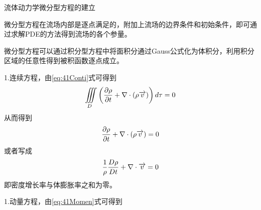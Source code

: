 
流体动力学微分型方程的建立

微分型方程在流场内部是逐点满足的，附加上流场的边界条件和初始条件，即可通过求解PDE的方法得到流场的各个参量。

微分型方程可以通过积分型方程中将面积分通过Gauss公式化为体积分，利用积分区域的任意性得到被积函数逐点成立。

1.连续方程，由\eqref{eq:41Conti}式可得到
\begin{equation}
\iiint\limits_D \left(\frac{\partial \rho}{\partial t}+\nabla\cdot(\rho \overrightarrow{v})\right)d\tau=0
\end{equation}
从而得到
\begin{equation}\label{eq:52Conti}
 \frac{\partial \rho}{\partial t}+\nabla\cdot(\rho \overrightarrow{v})=0
\end{equation}
或者写成
\begin{equation}\label{eq:52ContiMaterial}
 \frac{1}{\rho}\frac{D \rho}{D t}+\nabla\cdot\overrightarrow{v}=0
\end{equation}
即密度增长率与体膨胀率之和为零。

1.动量方程，由\eqref{eq:41Momen}式可得到

